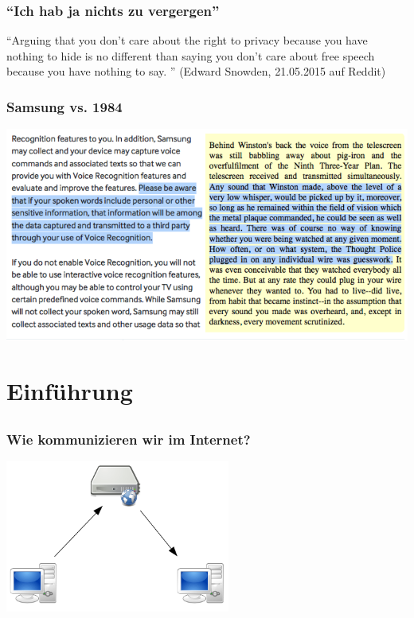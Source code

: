 \documentclass[12pt, xcolor={svgnames,table}]{beamer}
\begin{document}
\begin{frame}
    \frametitle{``Ich hab ja nichts zu vergergen''}
    \begin{center}
      ``Arguing that you don't care about the right to privacy because you have nothing to hide is no different than saying you don't care about free speech because you have nothing to say. ''
      (Edward Snowden, 21.05.2015 auf Reddit)
    \end{center}
\end{frame}

\begin{frame}
    \frametitle{Samsung vs. 1984}
    \begin{center}
      \includegraphics[height=0.7\textheight]{img/samsung-1984.png}
    \end{center}
\end{frame}

\section{Einführung}
\subsection{}

\begin{frame}
    \frametitle{Wie kommunizieren wir im Internet?}
    \begin{center}
      \includegraphics[height=5cm]{img/c-s.png}
    \end{center}
\end{frame}
\end{document}
